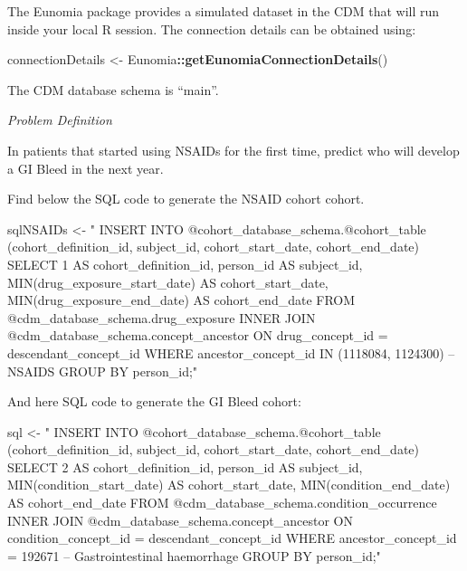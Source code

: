\documentclass[11pt]{book}
\newenvironment{Shaded}{\begin{snugshade}}{\end{snugshade}}
\newcommand{\KeywordTok}[1]{\textcolor[rgb]{0.13,0.29,0.53}{\textbf{#1}}}
\newcommand{\NormalTok}[1]{#1}
\newcommand{\OperatorTok}[1]{\textcolor[rgb]{0.81,0.36,0.00}{\textbf{#1}}}
\newcommand{\StringTok}[1]{\textcolor[rgb]{0.31,0.60,0.02}{#1}}
\theoremstyle{definition}
\theoremstyle{definition}
\theoremstyle{definition}
\theoremstyle{remark}
\begin{document}
The Eunomia package provides a simulated dataset in the CDM that will run inside your local R session. The connection details can be obtained using:

\begin{Shaded}
\begin{Highlighting}[]
\NormalTok{connectionDetails <-}\StringTok{ }\NormalTok{Eunomia}\OperatorTok{::}\KeywordTok{getEunomiaConnectionDetails}\NormalTok{()}
\end{Highlighting}
\end{Shaded}

The CDM database schema is ``main''.

\emph{Problem Definition}

In patients that started using NSAIDs for the first time, predict who will develop a GI Bleed in the next year.

Find below the SQL code to generate the NSAID cohort cohort.

\begin{Shaded}
\begin{Highlighting}[]
\NormalTok{sqlNSAIDs <-}\StringTok{ "}
\StringTok{INSERT INTO @cohort_database_schema.@cohort_table (cohort_definition_id, subject_id, cohort_start_date, cohort_end_date)}
\StringTok{SELECT 1 AS cohort_definition_id,}
\StringTok{  person_id AS subject_id,}
\StringTok{  MIN(drug_exposure_start_date) AS cohort_start_date,}
\StringTok{  MIN(drug_exposure_end_date) AS cohort_end_date}
\StringTok{FROM @cdm_database_schema.drug_exposure}
\StringTok{INNER JOIN @cdm_database_schema.concept_ancestor}
\StringTok{  ON drug_concept_id = descendant_concept_id}
\StringTok{WHERE ancestor_concept_id IN (1118084, 1124300) -- NSAIDS}
\StringTok{GROUP BY person_id;"}
\end{Highlighting}
\end{Shaded}

And here SQL code to generate the GI Bleed cohort:

\begin{Shaded}
\begin{Highlighting}[]
\NormalTok{sql <-}\StringTok{ "}
\StringTok{INSERT INTO @cohort_database_schema.@cohort_table (cohort_definition_id, subject_id, cohort_start_date, cohort_end_date)}
\StringTok{SELECT 2 AS cohort_definition_id,}
\StringTok{  person_id AS subject_id,}
\StringTok{  MIN(condition_start_date) AS cohort_start_date,}
\StringTok{  MIN(condition_end_date) AS cohort_end_date}
\StringTok{FROM @cdm_database_schema.condition_occurrence}
\StringTok{INNER JOIN @cdm_database_schema.concept_ancestor}
\StringTok{  ON condition_concept_id = descendant_concept_id}
\StringTok{WHERE ancestor_concept_id = 192671 -- Gastrointestinal haemorrhage}
\StringTok{GROUP BY person_id;"}
\end{Highlighting}
\end{Shaded}
\end{document}

